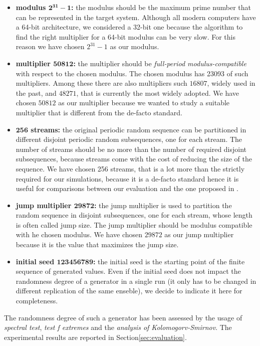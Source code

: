 \begin{itemize}
	\item \textbf{modulus $\mathbf{2^{31}-1}$:} the modulus should be the maximum prime number that can be represented in the target system. 
	Although all modern computers have a 64-bit architecture, we considered a 32-bit one because the algorithm to find the right multiplier for a 64-bit modulus can be very slow.
	For this reason we have chosen $2^{31}-1$ as our modulus.
	
	\item \textbf{multiplier $\mathbf{50812}$:} the multiplier should be \textit{full-period modulus-compatible} with respect to the chosen modulus. The chosen modulus has 23093 of such multipliers. Among these there are also multipliers such $16807$, widely used in the past, and $48271$, that is currently the most widely adopted.
	We have chosen $50812$ as our multiplier because we wanted to study a suitable multiplier that is different from the de-facto standard.
	
	\item \textbf{$\mathbf{256}$ streams:} the original periodic random sequence can be partitioned in different disjoint periodic random subsequences, one for each stream. 
	The number of streams should be no more than the number of required disjoint subsequences, because streams come with the cost of reducing the size of the sequence.
	We have chosen 256 streams, that is a lot more than the strictly required for our simulations, because it is a de-facto standard hence it is useful for comparisons between our evaluation and the one proposed in \cite{leemis2006discrete}.
	
	\item \textbf{jump multiplier $\mathbf{29872}$:} the jump multiplier is used to partition the random sequence in disjoint subsequences, one for each stream, whose length is often called jump size. The jump multiplier should be modulus compatible with he chosen modulus.
	We have chosen $29872$ as our jump multiplier because it is the value that maximizes the jump size.
	
	\item \textbf{initial seed $\mathbf{123456789}$:} the initial seed is the starting point of the finite sequence of generated values. Even if the initial seed does not impact the randomness degree of a generator in a single run (it only has to be changed in different replication of the same enseble), we decide to indicate it here for completeness. 
\end{itemize}

The randomness degree of such a generator has been assessed by the usage of \textit{spectral test}, \textit{test f extremes} and the \textit{analysis of Kolomogorv-Smirnov}.
%
The experimental results are reported in Section\ref{sec:evaluation}.
